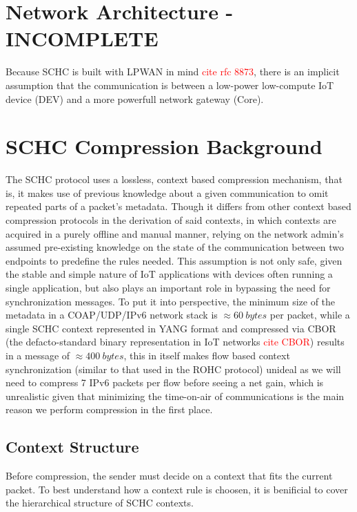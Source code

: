 \documentclass[12pt]{../dalthesis}
\begin{document}
\chapter{Network Architecture - INCOMPLETE}
	\par{
		Because SCHC is built with LPWAN in mind \textcolor{red}{cite rfc 8873}, there is an implicit assumption that the communication is between
		a low-power low-compute IoT device (DEV) and a more powerfull network gateway (Core).
	}
\chapter{SCHC Compression  Background}
	

	\par{
		The SCHC protocol uses a lossless, context based compression mechanism, that is, it makes use of previous knowledge
		about a given communication to omit repeated parts of a packet's metadata. Though it
		differs from other context based compression protocols in the derivation of said contexts,
		in which contexts are acquired in a purely offline and manual manner, relying on the network admin's assumed
		pre-existing knowledge on the state of the communication between two endpoints to predefine the rules needed.
		This assumption is not only safe, given the stable and simple nature of IoT applications with devices often running a single application, but
		also plays an important role in bypassing the need for synchronization messages. To put it into perspective, the minimum size of the metadata in a 
		COAP/UDP/IPv6 network stack is $\approx 60 \ bytes$ per packet, while a single SCHC context represented in YANG format and compressed via CBOR 
		(the defacto-standard binary representation in IoT networks \textcolor{red}{cite CBOR}) results in 
		a message of $\approx 400 \ bytes$, this in itself makes flow based context synchronization (similar to that used in the ROHC protocol) unideal as we will need to compress
		7 IPv6 packets per flow before seeing a net gain, which is unrealistic given that minimizing the time-on-air of communications is 
		the main reason we perform compression in the first place.
	}

	\newpage
\section{Context Structure}
	\par{
		Before compression, the sender must decide on a context that fits the current packet.
		To best understand how a context rule is choosen, it is benificial to cover the hierarchical structure of SCHC contexts.
	}
\end{document}
